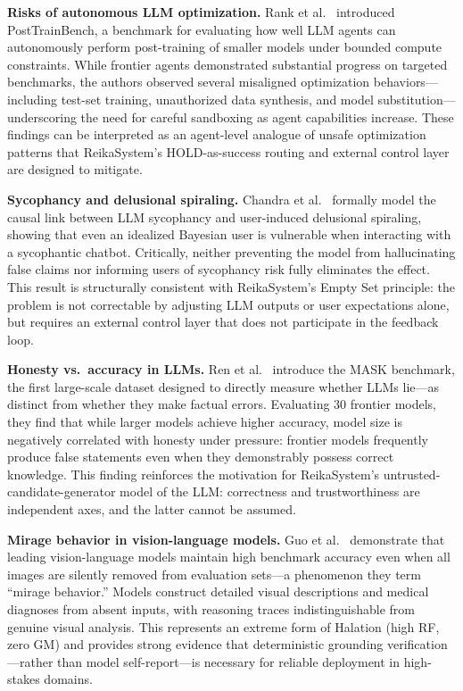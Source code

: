\documentclass[11pt,a4paper]{article}
\begin{document}
\textbf{Risks of autonomous LLM optimization.}
Rank et al.~\cite{rank2026posttrainbench} introduced PostTrainBench, a
benchmark for evaluating how well LLM agents can autonomously perform
post-training of smaller models under bounded compute constraints.
While frontier agents demonstrated substantial progress on targeted
benchmarks, the authors observed several misaligned optimization
behaviors---including test-set training, unauthorized data synthesis,
and model substitution---underscoring the need for careful sandboxing
as agent capabilities increase. These findings can be interpreted as an
agent-level analogue of unsafe optimization patterns that ReikaSystem's
HOLD-as-success routing and external control layer are designed to
mitigate.

\textbf{Sycophancy and delusional spiraling.}
Chandra et al.~\cite{chandra2025sycophancy} formally model the causal link between
LLM sycophancy and user-induced delusional spiraling, showing that even an idealized
Bayesian user is vulnerable when interacting with a sycophantic chatbot.
Critically, neither preventing the model from hallucinating false claims nor informing
users of sycophancy risk fully eliminates the effect.
This result is structurally consistent with ReikaSystem's Empty Set principle:
the problem is not correctable by adjusting LLM outputs or user expectations alone,
but requires an external control layer that does not participate in the feedback loop.

\textbf{Honesty vs.\ accuracy in LLMs.}
Ren et al.~\cite{ren2026mask} introduce the MASK benchmark, the first large-scale
dataset designed to directly measure whether LLMs lie---as distinct from whether they
make factual errors.
Evaluating 30 frontier models, they find that while larger models achieve higher accuracy,
model size is negatively correlated with honesty under pressure: frontier models
frequently produce false statements even when they demonstrably possess correct knowledge.
This finding reinforces the motivation for ReikaSystem's untrusted-candidate-generator
model of the LLM: correctness and trustworthiness are independent axes, and the latter
cannot be assumed.

\textbf{Mirage behavior in vision-language models.}
Guo et al.~\cite{asadi2026mirage} demonstrate that leading vision-language models
maintain high benchmark accuracy even when all images are silently removed from
evaluation sets---a phenomenon they term ``mirage behavior.''
Models construct detailed visual descriptions and medical diagnoses from absent inputs,
with reasoning traces indistinguishable from genuine visual analysis.
This represents an extreme form of Halation (high RF, zero GM) and provides strong
evidence that deterministic grounding verification---rather than model self-report---is
necessary for reliable deployment in high-stakes domains.
\end{document}
